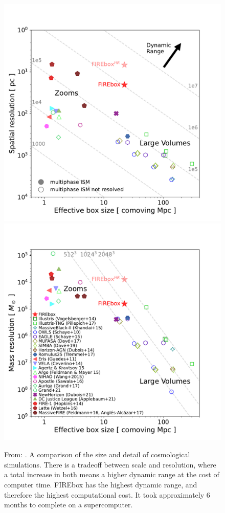 \begin{figure}
    \includegraphics[width=\textwidth/2]{figs/feldmann/fig2a}
    \includegraphics[width=\textwidth/2]{figs/feldmann/fig2b}
    
    \caption{From: \cite{feldmannFIREboxSimulatingGalaxies2022}. A comparison of the size and detail of cosmological simulations. There is a tradeoff between scale and resolution, where a total increase in both means a higher dynamic range at the cost of computer time. FIREbox has the highest dynamic range, and therefore the highest computational cost. It took approximately 6 months to complete on a supercomputer.}

    \label{fig:feldmann-dynrange}
\end{figure}

